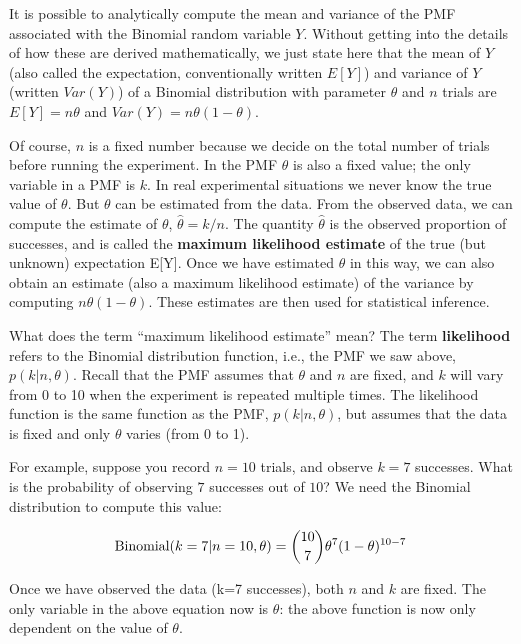 \documentclass[12pt,]{krantz}
\begin{document}
It is possible to analytically compute the mean and variance of the PMF associated with the Binomial random variable \(Y\). Without getting into the details of how these are derived mathematically, we just state here that the mean of \(Y\) (also called the expectation, conventionally written \(E[Y]\)) and variance of \(Y\) (written \(Var(Y)\)) of a Binomial distribution with parameter \(\theta\) and \(n\) trials are \(E[Y] = n\theta\) and \(Var(Y) = n\theta (1-\theta)\).

Of course, \(n\) is a fixed number because we decide on the total number of trials before running the experiment. In the PMF \(\theta\) is also a fixed value; the only variable in a PMF is \(k\). In real experimental situations we never know the true value of \(\theta\). But \(\theta\) can be estimated from the data. From the observed data, we can compute the estimate of \(\theta\), \(\hat \theta=k/n\). The quantity \(\hat \theta\) is the observed proportion of successes, and is called the \textbf{maximum likelihood estimate} of the true (but unknown) expectation E{[}Y{]}. Once we have estimated \(\theta\) in this way, we can also obtain an estimate (also a maximum likelihood estimate) of the variance by computing \(n\theta (1-\theta)\). These estimates are then used for statistical inference.

What does the term ``maximum likelihood estimate'' mean? The term \textbf{likelihood} refers to the Binomial distribution function, i.e., the PMF we saw above, \(p(k|n,\theta)\). Recall that the PMF assumes that \(\theta\) and \(n\) are fixed, and \(k\) will vary from 0 to 10 when the experiment is repeated multiple times. The likelihood function is the same function as the PMF, \(p(k|n,\theta)\), but assumes that the data is fixed and only \(\theta\) varies (from 0 to 1).

For example, suppose you record \(n=10\) trials, and observe \(k=7\) successes. What is the probability of observing \(7\) successes out of \(10\)? We need the Binomial distribution to compute this value:

\begin{equation}
\hbox{Binomial}(k=7|n=10,\theta) = 
\binom{10}{7} \theta^{7} (1-\theta)^{10-7}
\end{equation}

Once we have observed the data (k=7 successes), both \(n\) and \(k\) are fixed. The only variable in the above equation now is \(\theta\): the above function is now only dependent on the value of \(\theta\).
\end{document}
